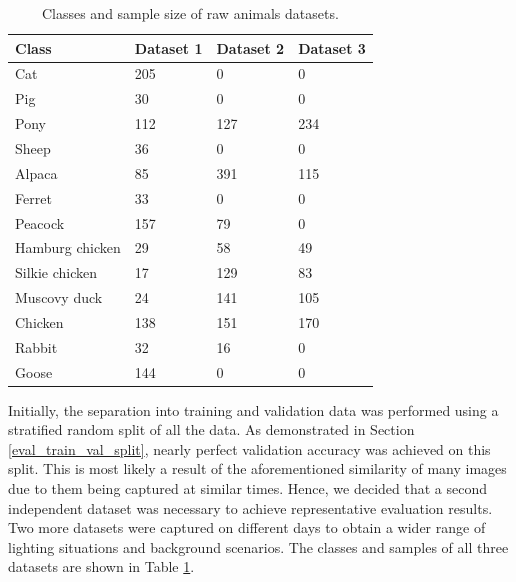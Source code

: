 \documentclass{l4proj}
\begin{document}
\begin{table}[ht]
  \centering
  \begin{tabular}{@{}llll@{}}
    \toprule
    \textbf{Class}  & \textbf{Dataset 1} & \textbf{Dataset 2} & \textbf{Dataset 3}  \\ \midrule
    Cat             & 205              & 0                    & 0                   \\ 
    Pig             & 30               & 0                    & 0                   \\
    Pony            & 112              & 127                  & 234                 \\
    Sheep           & 36               & 0                    & 0                   \\
    Alpaca          & 85               & 391                  & 115                 \\
    Ferret          & 33               & 0                    & 0                   \\
    Peacock         & 157              & 79                   & 0                   \\
    Hamburg chicken & 29               & 58                   & 49                  \\
    Silkie chicken  & 17               & 129                  & 83                  \\
    Muscovy duck    & 24               & 141                  & 105                 \\
    Chicken         & 138              & 151                  & 170                 \\
    Rabbit          & 32               & 16                   & 0                   \\
    Goose           & 144              & 0                    & 0                   \\ \bottomrule
  \end{tabular}
  \vspace*{3mm}
  \caption{Classes and sample size of raw animals datasets.}
  \label{table:raw_dataset}
  \vspace*{-3mm}
\end{table}

Initially, the separation into training and validation data was performed using a stratified random split of all the data. As demonstrated in Section \ref{eval_train_val_split}, nearly perfect validation accuracy was achieved on this split. This is most likely a result of the aforementioned similarity of many images due to them being captured at similar times. Hence, we decided that a second independent dataset was necessary to achieve representative evaluation results. Two more datasets were captured on different days to obtain a wider range of lighting situations and background scenarios. The classes and samples of all three datasets are shown in Table \ref{table:raw_dataset}.
\end{document}
